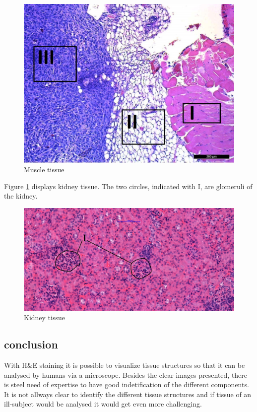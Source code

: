 \documentclass[dutch, a4paper, 11pt]{article}
\begin{document}
\begin{multicols}{2}
\begin{figure}[H]
    \centering
    \includegraphics[scale=0.4]{H&E 02}
    \caption{Muscle tissue}
    \label{fig:Mt}
\end{figure}

Figure \ref{fig:Mt} displays kidney tissue. The two circles, indicated with I, are glomeruli of the kidney.

\begin{figure}[H]
    \centering
    \includegraphics[scale=0.15]{H&E 12}
    \caption{Kidney tissue}
    \label{fig:Kt}
\end{figure}

\subsection{conclusion}

With H\&E staining it is possible to visualize tissue structures so that it can be analysed by humans via a microscope.
Besides the clear images presented, there is steel need of expertise to have good indetification of the different components.
It is not allways clear to identify the different tissue structures and if tissue of an ill-subject would be analysed it would get 
even more challenging.

\end{multicols}
\end{document}
